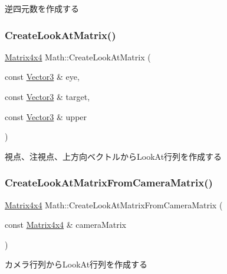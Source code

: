 逆四元数を作成する 

\mbox{\label{namespace_math_a33f8e9946f11a9efd4592ff441549a64}} 
\subsubsection{\texorpdfstring{Create\+Look\+At\+Matrix()}{CreateLookAtMatrix()}}
{\footnotesize\ttfamily \mbox{\hyperlink{struct_math_1_1_matrix4x4}{Matrix4x4}} Math\+::\+Create\+Look\+At\+Matrix (\begin{DoxyParamCaption}\item[{const \mbox{\hyperlink{struct_math_1_1_vector3}{Vector3}} \&}]{eye,  }\item[{const \mbox{\hyperlink{struct_math_1_1_vector3}{Vector3}} \&}]{target,  }\item[{const \mbox{\hyperlink{struct_math_1_1_vector3}{Vector3}} \&}]{upper }\end{DoxyParamCaption})}



視点、注視点、上方向ベクトルから\+Look\+At行列を作成する 

\mbox{\label{namespace_math_a902772771ec476f8ba2563babfcd865f}} 
\subsubsection{\texorpdfstring{Create\+Look\+At\+Matrix\+From\+Camera\+Matrix()}{CreateLookAtMatrixFromCameraMatrix()}}
{\footnotesize\ttfamily \mbox{\hyperlink{struct_math_1_1_matrix4x4}{Matrix4x4}} Math\+::\+Create\+Look\+At\+Matrix\+From\+Camera\+Matrix (\begin{DoxyParamCaption}\item[{const \mbox{\hyperlink{struct_math_1_1_matrix4x4}{Matrix4x4}} \&}]{camera\+Matrix }\end{DoxyParamCaption})}



カメラ行列から\+Look\+At行列を作成する 

\mbox{\label{namespace_math_a3a425ade3b937625acd000ced1caa45f}} 
